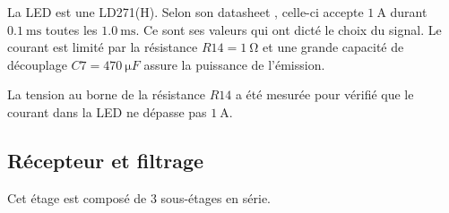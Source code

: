 \documentclass[french]{layout/Report}
\begin{document}
La LED est une LD271(H). Selon son datasheet \cite{LD271(H)}, celle-ci accepte $\SI{1}{\ampere}$ durant $\SI{0.1}{\milli\second}$ toutes les $\SI{1.0}{\milli\second}$. Ce sont ses valeurs qui ont dicté le choix du signal. Le courant est limité par la résistance $\mathit{R14} = \SI{1}{\ohm}$ et une grande capacité de découplage $\mathit{C7}=\SI{470}{\micro F}$ assure la puissance de l'émission.

La tension au borne de la résistance $\mathit{R14}$ a été mesurée pour vérifié que le courant dans la LED ne dépasse pas $\SI{1}{\ampere}$.

\subsection{Récepteur et filtrage}
Cet étage est composé de 3 sous-étages en série.
\end{document}

